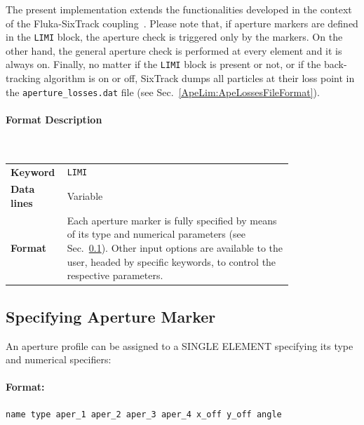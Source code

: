 The present implementation extends the functionalities developed in the context of the Fluka-SixTrack coupling~\cite{coupling:1,coupling:2}.
Please note that, if aperture markers are defined in the \texttt{LIMI} block, the aperture check is triggered only by the markers.
On the other hand, the general aperture check is performed at every element and it is always on.
Finally, no matter if the \texttt{LIMI} block is present or not, or if the back-tracking algorithm is on or off, SixTrack dumps all particles at their loss point in the \texttt{aperture\_losses.dat} file (see Sec.~\ref{ApeLim:ApeLossesFileFormat}).

\newpage
\paragraph{Format Description}~

\bigskip
\begin{tabular}{@{}lp{0.8\linewidth}}
    \textbf{Keyword}    & \texttt{LIMI}\index{LIMI} \\
    \textbf{Data lines} & Variable \\
    \textbf{Format}     & Each aperture marker is fully specified by means of its type and
                          numerical parameters (see Sec.~\ref{ApeLim:ApeSpecs}).
                          Other input options are available to the user,
                          headed by specific keywords, to control the respective parameters.
\end{tabular}

\bigskip
\subsection{Specifying Aperture Marker}\label{ApeLim:ApeSpecs}
An aperture profile can be assigned to a SINGLE ELEMENT specifying its type and numerical specifiers:

\paragraph{Format:}
\texttt{name type aper\_1 aper\_2 aper\_3 aper\_4 x\_off y\_off angle}

